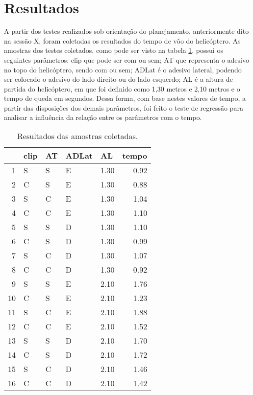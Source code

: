 \section{Resultados}

A partir dos testes realizados sob orientação do planejamento, anteriormente dito na sessão X, foram coletadas os resultados do tempo de vôo do helicóptero. As amostras dos testes coletados, como pode ser visto na tabela \ref{tab:amostras}, possui os seguintes parâmetros: clip que pode ser com ou sem; AT que representa o adesivo no topo do helicóptero, sendo com ou sem; ADLat é o adesivo lateral, podendo ser colocado o adesivo do lado direito ou do lado esquerdo; AL é a altura de partida do helicóptero, em que foi definido como 1,30 metros e 2,10 metros e o tempo de queda em segundos. Dessa forma, com base nestes valores de tempo, a partir das disposições dos demais parâmetros, foi feito o teste de regressão para analisar a influência da relação entre os parâmetros com o tempo.

\begin{table}[ht]
    \centering
    \caption{Resultados das amostras coletadas.}
    \begin{tabular}{rllllr}
      \hline
     & clip & AT & ADLat & AL & tempo \\ 
      \hline
    1 & S & S & E & 1.30 & 0.92 \\ 
      2 & C & S & E & 1.30 & 0.88 \\ 
      3 & S & C & E & 1.30 & 1.04 \\ 
      4 & C & C & E & 1.30 & 1.10 \\ 
      5 & S & S & D & 1.30 & 1.10 \\ 
      6 & C & S & D & 1.30 & 0.99 \\ 
      7 & S & C & D & 1.30 & 1.07 \\ 
      8 & C & C & D & 1.30 & 0.92 \\ 
      9 & S & S & E & 2.10 & 1.76 \\ 
      10 & C & S & E & 2.10 & 1.23 \\ 
      11 & S & C & E & 2.10 & 1.88 \\ 
      12 & C & C & E & 2.10 & 1.52 \\ 
      13 & S & S & D & 2.10 & 1.70 \\ 
      14 & C & S & D & 2.10 & 1.72 \\ 
      15 & S & C & D & 2.10 & 1.46 \\ 
      16 & C & C & D & 2.10 & 1.42 \\ 
       \hline
    \end{tabular}
    \label{tab:amostras}
\end{table}

